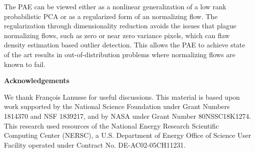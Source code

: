 \documentclass{article}
\begin{document}
The PAE can be viewed either as a nonlinear generalization of a low rank probabilistic PCA or as a regularized form of an normalizing flow. The regularization through dimensionality reduction avoids the issues that plague normalizing flows, such as zero or 
near zero variance pixels, which can flaw density estimation based outlier detection. This allows the PAE to achieve state of the art results in out-of-distribution problems where normalizing flows are known to fail. 

\newpage
{\bf Acknowledgements}

We thank Fran\c{c}ois Lanusse for useful discussions. 
This material is based upon work supported by the National Science Foundation under Grant Numbers 1814370 and NSF 1839217, and by NASA under Grant Number 80NSSC18K1274. This research used resources of the National Energy Research Scientific Computing Center (NERSC), a U.S. Department of Energy Office of Science User Facility operated under Contract No. DE-AC02-05CH11231.
  

\end{document}
